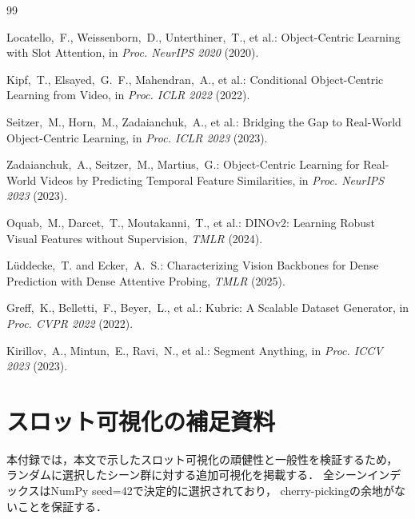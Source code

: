 \documentclass[dvipdfmx,twocolumn]{jarticle}
\begin{document}
\begin{thebibliography}{99}

Locatello,~F., Weissenborn,~D., Unterthiner,~T., et al.:
Object-Centric Learning with Slot Attention,
in \textit{Proc. NeurIPS 2020} (2020).

Kipf,~T., Elsayed,~G.~F., Mahendran,~A., et al.:
Conditional Object-Centric Learning from Video,
in \textit{Proc. ICLR 2022} (2022).

Seitzer,~M., Horn,~M., Zadaianchuk,~A., et al.:
Bridging the Gap to Real-World Object-Centric Learning,
in \textit{Proc. ICLR 2023} (2023).

Zadaianchuk,~A., Seitzer,~M., Martius,~G.:
Object-Centric Learning for Real-World Videos
by Predicting Temporal Feature Similarities,
in \textit{Proc. NeurIPS 2023} (2023).

Oquab,~M., Darcet,~T., Moutakanni,~T., et al.:
DINOv2: Learning Robust Visual Features without Supervision,
\textit{TMLR} (2024).

L\"{u}ddecke,~T. and Ecker,~A.~S.:
Characterizing Vision Backbones for Dense Prediction
with Dense Attentive Probing,
\textit{TMLR} (2025).

Greff,~K., Belletti,~F., Beyer,~L., et al.:
Kubric: A Scalable Dataset Generator,
in \textit{Proc. CVPR 2022} (2022).

Kirillov,~A., Mintun,~E., Ravi,~N., et al.:
Segment Anything,
in \textit{Proc. ICCV 2023} (2023).

\end{thebibliography}

\appendix

\section{スロット可視化の補足資料}

本付録では，本文で示したスロット可視化の頑健性と一般性を検証するため，
ランダムに選択したシーン群に対する追加可視化を掲載する．
全シーンインデックスはNumPy seed=42で決定的に選択されており，
cherry-pickingの余地がないことを保証する．
\end{document}
